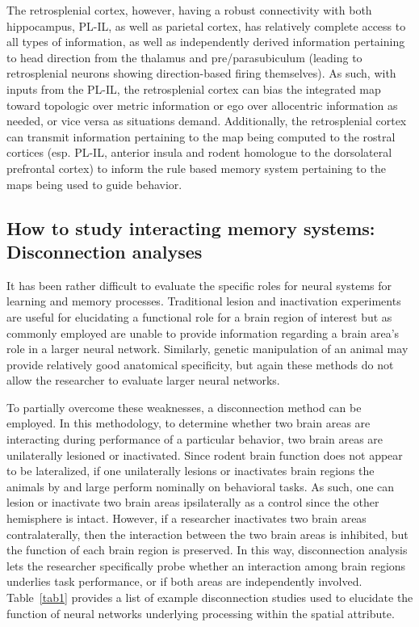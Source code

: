 \documentclass[doc, longtable]{apa6}
\begin{document}
The retrosplenial cortex, however, having a robust connectivity with both hippocampus, PL-IL, as well as parietal cortex, has relatively complete access to all types of information, as well as independently derived information pertaining to head direction from the thalamus and pre/parasubiculum (leading to retrosplenial neurons showing direction-based firing themselves). As such, with inputs from the PL-IL, the retrosplenial cortex can bias the integrated map toward topologic over metric information or ego over allocentric information as needed, or vice versa as situations demand. Additionally, the retrosplenial cortex can transmit information pertaining to the map being computed to the rostral cortices (esp. PL-IL, anterior insula and rodent homologue to the dorsolateral prefrontal cortex) to inform the rule based memory system pertaining to the maps being used to guide behavior.


\subsection{How to study interacting memory systems: Disconnection analyses}
It has been rather difficult to evaluate the specific roles for neural systems for learning and memory processes. Traditional lesion and inactivation experiments are useful for elucidating a functional role for a brain region of interest but as commonly employed are unable to provide information regarding a brain area's role in a larger neural network. Similarly, genetic manipulation of an animal may provide relatively good anatomical specificity, but again these methods do not allow the researcher to evaluate larger neural networks.

To partially overcome these weaknesses, a disconnection method can be employed. In this methodology, to determine whether two brain areas are interacting during performance of a particular behavior, two brain areas are unilaterally lesioned or inactivated. Since rodent brain function does not appear to be lateralized, if one unilaterally lesions or inactivates brain regions the animals by and large perform nominally on behavioral tasks. As such, one can lesion or inactivate two brain areas ipsilaterally as a control since the other hemisphere is intact. However, if a researcher inactivates two brain areas contralaterally, then the interaction between the two brain areas is inhibited, but the function of each brain region is preserved. In this way, disconnection analysis lets the researcher specifically probe whether an interaction among brain regions underlies task performance, or if both areas are independently involved. Table~\ref{tab1} provides a list of example disconnection studies used to elucidate the function of neural networks underlying processing within the spatial attribute. 
\end{document}
